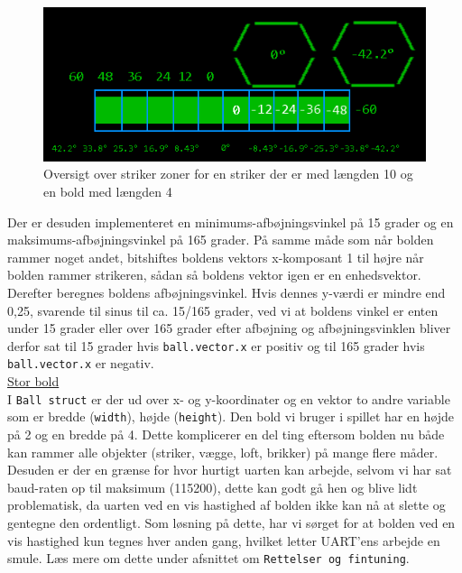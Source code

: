 \begin{figure}[h!]
\centering
\includegraphics[scale=0.8]{figs/striker_zones.png}
\caption{Oversigt over striker zoner for en striker der er med længden 10 og en bold med længden 4}
\label{fig:striker_zones}
\end{figure}
\newpage

Der er desuden implementeret en minimums-afbøjningsvinkel på 15 grader og en maksimums-afbøjningsvinkel på 165 grader. På samme måde som når bolden rammer noget andet, bitshiftes boldens vektors x-komposant 1 til højre når bolden rammer strikeren, sådan så boldens vektor igen er en enhedsvektor. Derefter beregnes boldens afbøjningsvinkel. Hvis dennes y-værdi er mindre end 0,25, svarende til sinus til ca. 15/165 grader, ved vi at boldens vinkel er enten under 15 grader eller over 165 grader efter afbøjning og afbøjningsvinklen bliver derfor sat til 15 grader hvis \texttt{ball.vector.x} er positiv og til 165 grader hvis \texttt{ball.vector.x} er negativ.\\

\underline{Stor bold}\\

I \texttt{Ball struct} er der ud over x- og y-koordinater og en vektor to andre variable som er bredde (\texttt{width}), højde (\texttt{height}). Den bold vi bruger i spillet har en højde på 2 og en bredde på 4. Dette komplicerer en del ting eftersom bolden nu både kan rammer alle objekter (striker, vægge, loft, brikker) på mange flere måder. Desuden er der en grænse for hvor hurtigt uarten kan arbejde, selvom vi har sat baud-raten op til maksimum (115200), dette kan godt gå hen og blive lidt problematisk, da uarten ved en vis hastighed af bolden ikke kan nå at slette og gentegne den ordentligt. Som løsning på dette, har vi sørget for at bolden ved en vis hastighed kun tegnes hver anden gang, hvilket letter UART'ens arbejde en smule. Læs mere om dette under  afsnittet om \texttt{Rettelser og fintuning}.\\

